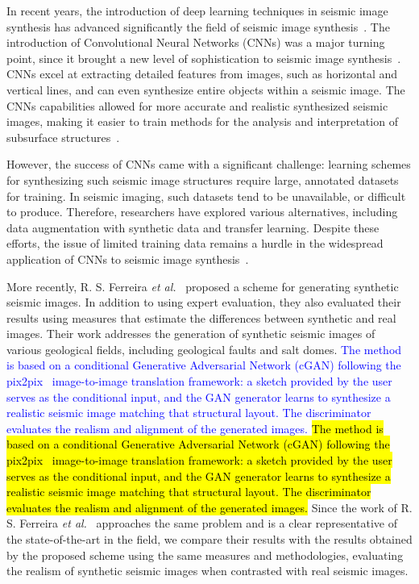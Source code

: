 \documentclass{ieeeaccess}
\providecommand{\DIFaddbegin}{} %
\providecommand{\DIFaddend}{} %
\newcommand{\DIFaddincludegraphics}[2][]{{\color{blue}\fbox{\DIFOincludegraphics[#1]{#2}}}} %
\DeclareRobustCommand{\DIFaddbegin}{\DIFOaddbegin \let\includegraphics\DIFaddincludegraphics} %
\DeclareRobustCommand{\DIFaddend}{\DIFOaddend \let\includegraphics\DIFOincludegraphics} %
\providecommand{\DIFadd}[1]{\ifmmode\textcolor{blue}{#1}\else\hl{#1}\fi}
\renewcommand{\DIFadd}[1]{\ifmmode\textcolor{blue}{#1}\else\hl{#1}\fi}
\begin{document}
In recent years, the introduction of deep learning techniques in seismic image synthesis has advanced significantly  the field of seismic image synthesis~\cite{Zeng2019}. The introduction of Convolutional Neural Networks (CNNs) was a major turning point, since it brought a new level of sophistication to seismic image synthesis~\cite{Powers2011}. CNNs excel at extracting detailed features from images, such as horizontal and vertical lines, and can even synthesize entire objects within a seismic image. The CNNs capabilities allowed for more accurate and realistic synthesized seismic images,  making it easier to train methods for the analysis and interpretation of subsurface structures~\cite{Powers2011}. 

However, the success of CNNs came with a significant challenge: learning schemes for synthesizing such seismic image structures require large, annotated datasets for training. In seismic imaging, such datasets tend to be unavailable, or difficult to produce. Therefore, researchers have explored various alternatives, including data augmentation with synthetic data and transfer learning. Despite these efforts, the issue of limited training data remains a hurdle in the widespread application of CNNs to seismic image synthesis~\cite{Wang2021}.

More recently, R. S. Ferreira \emph{et al.}~\cite{Ferreira2020} proposed a scheme for generating synthetic seismic images. In addition to using expert evaluation, they also evaluated their results using measures that estimate the differences between synthetic and real images. Their work addresses the generation of synthetic seismic images of various geological fields, including geological faults and salt domes. \DIFaddbegin \DIFadd{The method is based on a conditional Generative Adversarial Network (cGAN) following the pix2pix~\cite{pix2pix2017} image-to-image translation framework: a sketch provided by the user serves as the conditional input, and the GAN generator learns to synthesize a realistic seismic image matching that structural layout. The discriminator evaluates the realism and alignment of the generated images. }\DIFaddend Since the work of R. S. Ferreira \emph{et al.}~\cite{Ferreira2020} approaches the same problem and is a clear representative of the state-of-the-art in the field, we compare their results with the results obtained by the proposed scheme using the same measures and methodologies, evaluating the realism of synthetic seismic images when contrasted with real seismic images.
\end{document}
